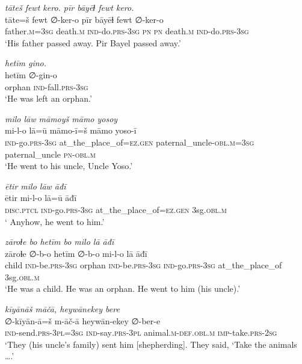 \ea \label{ŽP.8}
\textit{tāteš fewt kero. pīr bāyēɫ fewt kero.} \\ 
\gll tāte=š fewt ∅-ker-o pīr bāyēɫ fewt ∅-ker-o \\ 
 father\textsc{.m}\textsc{=3sg} death\textsc{.m} \textsc{ind-}do\textsc{.prs}\textsc{-3sg} \textsc{pn} \textsc{pn} death\textsc{.m} \textsc{ind-}do\textsc{.prs}\textsc{-3sg} \\ 
\glt `His father passed away. Pir Bayel passed away.'
\z 
 
\ea \label{ŽP.9}
\textit{hetīm gino.} \\ 
\gll hetīm ∅-gin-o \\ 
 orphan \textsc{ind-}fall\textsc{.prs}\textsc{-3sg} \\ 
\glt `He was left an orphan.'
\z 
 
\ea \label{ŽP.11}
\textit{milo lāw māmoyš māmo yosoy} \\ 
\gll mi-l-o lā=ū māmo-ī=š māmo yoso-ī \\ 
 \textsc{ind-}go\textsc{.prs}\textsc{-3sg} at\_the\_place\_of\textsc{\textsc{=ez.gen}} paternal\_uncle\textsc{-obl}\textsc{.m}\textsc{=3sg} paternal\_uncle \textsc{pn}\textsc{-obl}\textsc{.m} \\ 
\glt `He went to his uncle, Uncle Yoso.'
\z 
 
\ea \label{ŽP.13}
\textit{ētir milo lāw āđī} \\ 
\gll ētir mi-l-o lā=ū āđī \\ 
 \textsc{disc.ptcl} \textsc{ind-}go\textsc{.prs}\textsc{-3sg} at\_the\_place\_of\textsc{\textsc{=ez.gen}} 3sg\textsc{.obl}\textsc{.m} \\ 
\glt ` Anyhow, he went to him.'
\z 
 
\ea \label{ŽP.14}
\textit{zāroɫe bo hetīm bo milo lā āđī} \\ 
\gll zāroɫe ∅-b-o hetīm ∅-b-o mi-l-o lā āđī \\ 
 child \textsc{ind-}be\textsc{.prs}\textsc{-3sg} orphan \textsc{ind-}be\textsc{.prs}\textsc{-3sg} \textsc{ind-}go\textsc{.prs}\textsc{-3sg} at\_the\_place\_of 3sg\textsc{.obl}\textsc{.m} \\ 
\glt `He was a child. He was an orphan. He went to him (his uncle).'
\z 
 
\ea \label{ŽP.18}
\textit{kīyānāš māčā, heywānekey bere} \\ 
\gll ∅-kīyān-ā=š m-āč-ā heywān-ekey ∅-ber-e \\ 
 \textsc{ind-}send\textsc{.prs}\textsc{-3pl}\textsc{=3sg} \textsc{ind-}say\textsc{.prs}\textsc{-3pl} animal\textsc{.m}\textsc{-def}\textsc{.obl}\textsc{.m} \textsc{imp-}take\textsc{.prs}-\textsc{2sg} \\ 
\glt `They (his uncle’s family) sent him [shepherding]. They said, ‘Take the animals ….'
\z 
 
